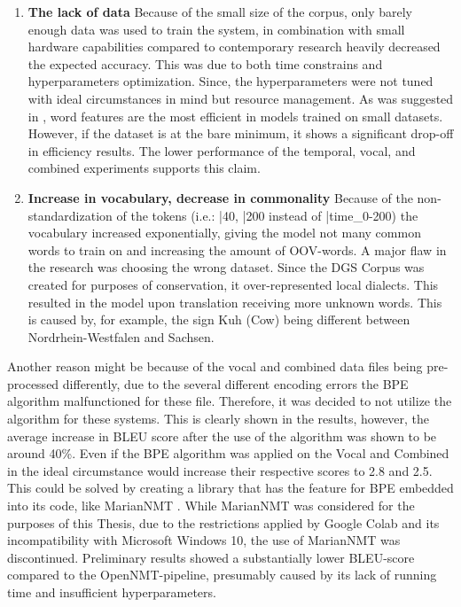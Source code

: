 \begin{enumerate}
    \item \textbf{The lack of data} Because of the small size of the corpus, only barely enough data was used to train the system, in combination with small hardware capabilities compared to contemporary research heavily decreased the expected accuracy. This was due to both time constrains and hyperparameters optimization. Since, the hyperparameters were not tuned with ideal circumstances in mind but resource management. As was suggested in \citet{qi2018and}, word features are the most efficient in models trained on small datasets. However, if the dataset is at the bare minimum, it shows a significant drop-off in efficiency results. The lower performance of the temporal, vocal, and combined experiments supports this claim.  
    \item \textbf{Increase in vocabulary, decrease in commonality} Because of the non-standardization of the tokens (i.e.: |40, |200 instead of |time\_0-200) the vocabulary increased exponentially, giving the model not many common words to train on and increasing the amount of OOV-words. A major flaw in the research was choosing the wrong dataset. Since the DGS Corpus \cite{dgscorpus_3} was created for purposes of conservation, it over-represented local dialects. This resulted in the model upon translation receiving more unknown words. This is caused by, for example, the sign Kuh (Cow) being different between Nordrhein-Westfalen and Sachsen.
\end{enumerate}

Another reason might be because of the vocal and combined data files being pre-processed differently, due to the several different encoding errors the BPE algorithm malfunctioned for these file. Therefore, it was decided to not utilize the algorithm for these systems. This is clearly shown in the results, however, the average increase in BLEU score after the use of the algorithm was shown to be around 40\%. Even if the BPE algorithm was applied on the Vocal and Combined in the ideal circumstance would increase their respective scores to 2.8 and 2.5. This could be solved by creating a library that has the feature for BPE embedded into its code, like MarianNMT \cite{mariannmt}. While MarianNMT was considered for the purposes of this Thesis, due to the restrictions applied by Google Colab and its incompatibility with Microsoft Windows 10, the use of MarianNMT was discontinued. Preliminary results showed a substantially lower BLEU-score compared to the OpenNMT-pipeline, presumably caused by its lack of running time and insufficient hyperparameters.



